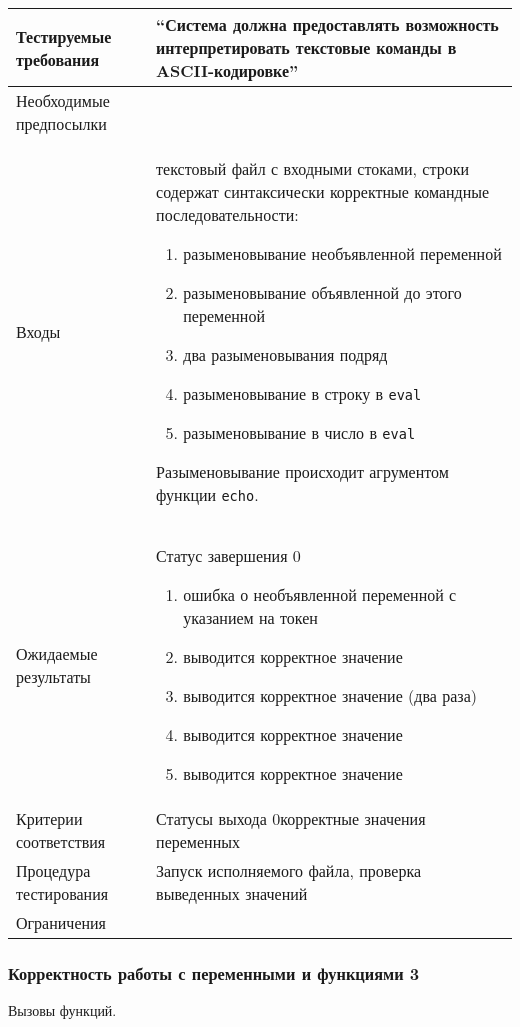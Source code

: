 \documentclass[a4paper, 12pt]{article}
\begin{document}
\begin{table}[H]
	\centering
	\begin{tabular}{|l|p{4in}|}
		\hline
		Тестируемые требования	&``Система должна предоставлять возможность интерпретировать текстовые
		команды в ASCII-кодировке''\\
		\hline
		Необходимые предпосылки	&\\
		\hline
		Входы			&текстовый файл с входными стоками,\newline
		строки содержат синтаксически корректные командные последовательности:
		\begin{enumerate}
			\item разыменовывание необъявленной переменной
			\item разыменовывание объявленной до этого переменной
			\item два разыменовывания подряд
			\item разыменовывание в строку в {\tt eval}
			\item разыменовывание в число в {\tt eval}
		\end{enumerate}
		Разыменовывание происходит агрументом функции {\tt echo}.\\
		\hline
		Ожидаемые результаты	&Статус завершения 0\newline
		\begin{enumerate}
			\item ошибка о необъявленной переменной с указанием на токен
			\item выводится корректное значение
			\item выводится корректное значение (два раза)
			\item выводится корректное значение
			\item выводится корректное значение
		\end{enumerate}
		\\
		\hline
		Критерии соответствия	&Статусы выхода 0\newline корректные значения переменных\\
		\hline
		Процедура тестирования	&Запуск исполняемого файла, \newline проверка выведенных значений\\
		\hline
		Ограничения		&\\
		\hline
	\end{tabular}
\end{table}

\subsubsection{Корректность работы с переменными и функциями 3} %
Вызовы функций.
\end{document}
